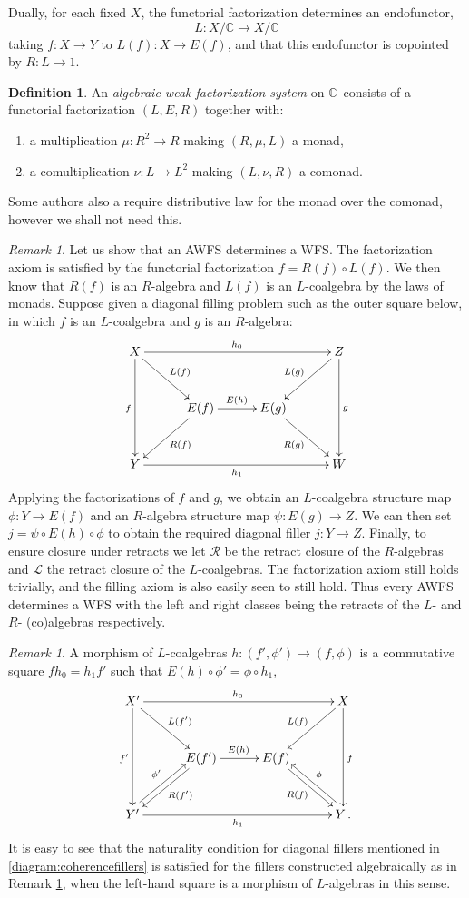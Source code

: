 \documentclass[12pt]{article}
\newcommand{\C}{\ensuremath{\mathbb{C}}}
\renewcommand{\L}{\ensuremath{\mathcal{L}}}
\newcommand{\R}{\ensuremath{\mathcal{R}}}
\theoremstyle{remark}
\newtheorem{remark}[theorem]{Remark}
\theoremstyle{definition}
\newtheorem{definition}[theorem]{Definition}
\begin{document}
Dually, for each fixed $X$, the functorial factorization determines an endo\-functor, 
\[
L : X/\C \to X/\C
\]
taking $f:X\to Y$ to $L(f) : X\to E(f)$, and that this endofunctor is copointed by $R : L \to 1$.

\begin{definition}
An \emph{algebraic weak factorization system} on \C\ consists of a functorial factorization $(L,E,R)$ together with:
\begin{enumerate}
\item a  multiplication $\mu : R^2 \to R$ making $(R, \mu, L)$ a monad,
\item a comultiplication $\nu : L \to L^2$ making $(L, \nu, R)$ a comonad.
\end{enumerate}
Some authors also a require distributive law for the monad over the comonad, however we shall not need this.
\end{definition}

\begin{remark}\label{AWFSisWFS} Let us show that an AWFS determines a WFS.  The factorization axiom is satisfied by the functorial factorization $f = R(f)\circ L(f)$.  We then know that $R(f)$ is an $R$-algebra and $L(f)$ is an $L$-coalgebra by the laws of monads.  Suppose given a diagonal filling problem such as  the outer square below, in which $f$ is an $L$-coalgebra and $g$ is an $R$-algebra:
\[
\xymatrix@=3em{
X \ar[dd]_{f} \ar[rd]^{L(f)} \ar[rrr]^{h_0} &&& \ar[dd]^{g} \ar[ld]_{L(g)} Z\\
   & E(f) \ar[r]^{E(h)} \ar[ld]^{R(f)} & E(g) \ar[rd]_{R(g)} & \\
Y  \ar[rrr]_{h_1} &&&  W
}
\]
Applying the factorizations of $f$ and $g$, we obtain an $L$-coalgebra structure map $\phi : Y\to E(f)$ and an $R$-algebra structure map $\psi : E(g)\to Z$. We can then set $ j = \psi\circ E(h)\circ \phi$ to obtain the required diagonal filler $j : Y \to Z$.  Finally, to ensure closure under retracts we let $\R$ be the retract closure of the $R$-algebras and $\L$ the retract closure of the $L$-coalgebras.  The factorization axiom still holds trivially, and the filling axiom is also easily seen to still hold.  Thus every AWFS determines a WFS with the left and right classes being the retracts of the $L$- and $R$- (co)algebras respectively.
\end{remark}


\begin{remark} A morphism of $L$-coalgebras $h : (f',\phi')\to (f,\phi)$ is a commutative square $fh_0 = h_1f'$ such that $E(h)\circ\phi' = \phi\circ h_1$,
\[
\xymatrix@=3em{
X' \ar[dd]_{f'} \ar[rd]^{L(f')} \ar[rrr]^{h_0} &&& \ar[dd]^{f} \ar[ld]_{L(f)} X\\
   & E(f') \ar[r]^{E(h)} \ar[ld]^{R(f')} & E(f) \ar[rd]_{R(f)} & \\
Y'  \ar[rrr]_{h_1} \ar@<1ex>[ur]^{\phi'} &&& \ar@<-1ex>[ul]_{\phi} Y\,.
}
\]
%
It is easy to see that the naturality condition for diagonal fillers mentioned in \eqref{diagram:coherencefillers} is satisfied for the fillers constructed algebraically as in Remark \ref{AWFSisWFS}, when the left-hand square is a morphism of $L$-algebras in this sense.
\end{remark}
\end{document}
